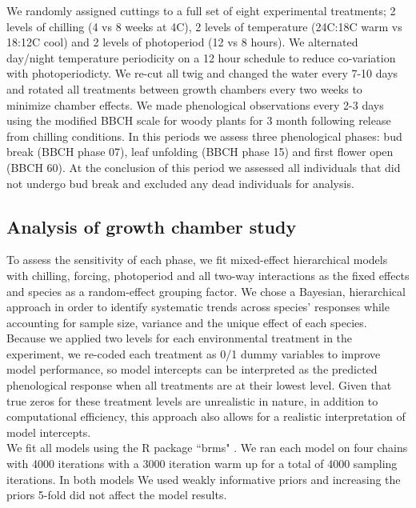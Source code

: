 \documentclass[11pt]{article}
\begin{document}
\noindent We randomly assigned cuttings to a full set of eight experimental treatments; 2 levels of chilling (4 vs 8 weeks at 4\degree C), 2 levels of temperature (24\degree C:18\degree C warm vs 18\degree:12\degree C cool) and 2 levels of photoperiod (12 vs 8 hours). We alternated day/night temperature periodicity on a 12 hour schedule to reduce co-variation with photoperiodicty. We re-cut all twig and changed the water every 7-10 days and rotated all treatments between growth chambers every two weeks to minimize chamber effects. We made phenological observations every 2-3 days using the modified BBCH scale for woody plants \citep{} for 3 month following release from chilling conditions. In this periods we assess three phenological phases: bud break (BBCH phase 07), leaf unfolding (BBCH phase 15) and first flower open (BBCH 60). At the conclusion of this period we assessed all individuals that did not undergo bud break and excluded any dead individuals for analysis.
\subsection*{Analysis of growth chamber study}
\noindent To assess the sensitivity of each phase, we fit mixed-effect hierarchical models with chilling, forcing, photoperiod and all two-way interactions as the fixed effects and species as a random-effect grouping factor. We chose a Bayesian, hierarchical approach in order to identify systematic trends across species' responses while accounting for sample size, variance and the unique effect of each species.\\

\noindent Because we applied two levels for each environmental treatment in the experiment, we re-coded each treatment as 0/1 dummy variables to improve model performance, so model intercepts can be interpreted as the predicted phenological response when all treatments are at their lowest level. Given that true zeros for these treatment levels are unrealistic in nature, in addition to computational efficiency, this approach also allows for a realistic interpretation of model intercepts.\\  

\noindent We fit all models using the R package ``brms" \citep{}. We ran each model on four chains with 4000 iterations with a 3000 iteration warm up for a total of 4000 sampling iterations. In both models We used weakly informative priors and increasing the priors 5-fold did not affect the model results.\\
\end{document}
